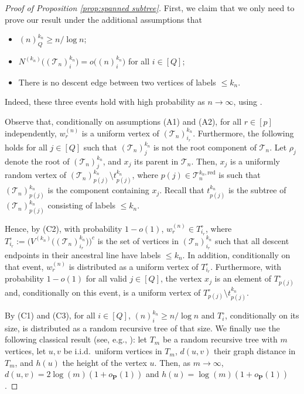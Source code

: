 \documentclass{article}
\theoremstyle{remark}
\newcommand{\cT}{\mathcal{T}}
\newcommand{\red}{\mathrm{red}}
\begin{document}
\begin{proof}[Proof of Proposition \ref{prop:spanned subtree}]
First, we claim that we only need to prove our result under the additional assumptions that
\begin{itemize}
    \item[(C1)] $(n)_Q^{k_n} \geq n/\log n$; 
    \item[(C2)] $N^{(k_n)}\big( (\cT_n)_i^{k_n} \big) = o\big( (n)_i^{k_n} \big)$ for all $i \in [Q]$;
    \item[(C3)] There is no descent edge between two vertices of labels $\leq k_n$. 
\end{itemize}
Indeed, these three events hold with high probability as $n \rightarrow \infty$, using .

Observe that, conditionally on assumptions (A1) and (A2), for all $r \in [p]$ independently, $w_r^{(n)}$ is a uniform vertex of $(\cT_n)_{i_r}^{k_n}$.
Furthermore, the following holds for all $j\in[Q]$ such that $(\cT_n)_j^{k_n}$ is not the root component of $\cT_n$.
Let $\rho_j$ denote the root of $(\cT_n)_j^{k_n}$, and $x_j$ its parent in $\cT_n$.
Then, $x_j$ is a uniformly random vertex of $(\cT_n)_{p(j)}^{k_n} \setminus t_{p(j)}^{k_n}$, where $p(j) \in \cT_n^{k_n,\red}$ is such that $(\cT_n)_{p(j)}^{k_n}$ is the component containing $x_j$. 
Recall that $t_{p(j)}^{k_n}$ is the subtree of $(\cT_n)_{p(j)}^{k_n}$ consisting of labels $\le k_n$.

Hence, by (C2), with probability $1-o(1)$, $w_r^{(n)} \in T^\circ_{i_r}$, where $T^\circ_{i_r} := \big( V^{(k_n)}\big( (\cT_n)_{i_r}^{k_n} \big) \big)^c$ is the set of vertices in $(\cT_n)_{i_r}^{k_n}$ such that all descent endpoints in their ancestral line have labels $\leq k_n$. 
In addition, conditionally on that event, $w_r^{(n)}$ is distributed as a uniform vertex of $T^\circ_{i_r}$. 
Furthermore, with probability $1-o(1)$ for all valid $j\in[Q]$, the vertex $x_j$ is an element of $T^\circ_{p(j)}$ and, conditionally on this event, is a uniform vertex of $T^\circ_{p(j)} \setminus t_{p(j)}^{k_n}$. 

By (C1) and (C3), for all $i \in [Q]$, $(n)_i^{k_n} \geq n/\log n$ and $T^\circ_i$, conditionally on its size, is distributed as a random recursive tree of that size. 
We finally use the following classical result (see, e.g., \cite{Panholzer_2004}): let $T_m$ be a random recursive tree with $m$ vertices, let $u,v$ be i.i.d.\ uniform vertices in $T_m$, $d(u,v)$ their graph distance in $T_m$, and $h(u)$ the height of the vertex $u$. Then, as $m \rightarrow \infty$, $d(u,v) = 2\log(m)(1+o_{\textbf{P}}(1))$ and $h(u)=\log(m)(1+o_{\textbf{P}}(1))$.


\end{proof}
\end{document}
